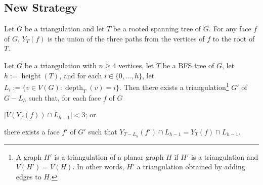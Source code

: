 \documentclass{patmorin}
\DeclareMathOperator{\height}{height}
\DeclareMathOperator{\depth}{depth}
\begin{document}
\subsection{New Strategy}


Let $G$ be a triangulation and let $T$ be a rooted spanning tree of $G$.  For any face $f$ of $G$, $Y_T(f)$ is the union of the three paths from the vertices of $f$ to the root of $T$.

\begin{lem}\label{retriangulate}
  Let $G$ be a triangulation with $n\ge 4$ vertices, let $T$ be a BFS tree of $G$, let $h:=\height(T)$, and for each $i\in\{0,\ldots,h\}$, let $L_i:=\{v\in V(G):\depth_T(v)=i\}$.  Then there exists a triangulation\footnote{A graph $H'$ is a triangulation of a planar graph $H$ if $H'$ is a triangulation and $V(H')=V(H)$. In other words, $H'$ a triangulation obtained by adding edges to $H$.} $G'$ of $G-L_h$ such that, for each face $f$ of $G$
  \begin{compactenum}
    \item $|V(Y_T(f))\cap L_{h-1}| < 3$; or
    \item there exists a face $f'$ of $G'$ such that $Y_{T-L_h}(f')\cap L_{h-1}=Y_T(f)\cap L_{h-1}$.
  \end{compactenum}
\end{lem}
\end{document}
